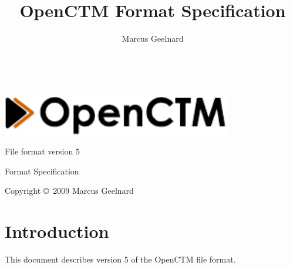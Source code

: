 %
%



\author{Marcus Geelnard}
\title{OpenCTM Format Specification}




\begin{titlepage}
\begin{center}
~
\vspace{5cm}

\includegraphics[width=10.0cm]{logo.pdf}
\vspace{0.4cm}

{\large File format version 5}

\vspace{1.0cm}

{\Large Format Specification}
\vspace{1.5cm}

Copyright \copyright \ 2009 Marcus Geelnard
\end{center}
\end{titlepage}



\tableofcontents



\chapter{Introduction}
This document describes version 5 of the OpenCTM file format.


